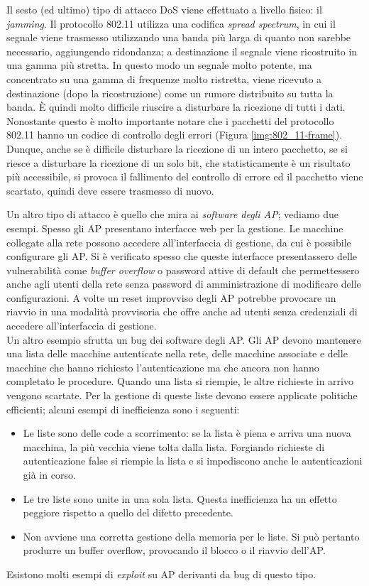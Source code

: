 Il sesto (ed ultimo) tipo di attacco DoS viene effettuato a livello fisico: il \textit{jamming}. Il protocollo 802.11 utilizza una codifica \textit{spread spectrum}, in cui il segnale viene trasmesso utilizzando una banda più larga di quanto non sarebbe necessario, aggiungendo ridondanza; a destinazione il segnale viene ricostruito in una gamma più stretta. In questo modo un segnale molto potente, ma concentrato su una gamma di frequenze molto ristretta, viene ricevuto a destinazione (dopo la ricostruzione) come un rumore distribuito su tutta la banda. È quindi molto difficile riuscire a disturbare la ricezione di tutti i dati. Nonostante questo è molto importante notare che i pacchetti del protocollo 802.11 hanno un codice di controllo degli errori (Figura \ref{img:802_11-frame}). Dunque, anche se è difficile disturbare la ricezione di un intero pacchetto, se si riesce a disturbare la ricezione di un solo bit, che statisticamente è un risultato più accessibile, si provoca il fallimento del controllo di errore ed il pacchetto viene scartato, quindi deve essere trasmesso di nuovo.

Un altro tipo di attacco è quello che mira ai \textit{software degli AP}; vediamo due esempi. Spesso gli AP presentano interfacce web per la gestione. Le macchine collegate alla rete possono accedere all'interfaccia di gestione, da cui è possibile configurare gli AP. Si è verificato spesso che queste interfacce presentassero delle vulnerabilità come \textit{buffer overflow} o password attive di default che permettessero anche agli utenti della rete senza password di amministrazione di modificare delle configurazioni. A volte un reset improvviso degli AP potrebbe provocare un riavvio in una modalità provvisoria che offre anche ad utenti senza credenziali di accedere all'interfaccia di gestione.\\
Un altro esempio sfrutta un bug dei software degli AP. Gli AP devono mantenere una lista delle macchine autenticate nella rete, delle macchine associate e delle macchine che hanno richiesto l'autenticazione ma che ancora non hanno completato le procedure. Quando una lista si riempie, le altre richieste in arrivo vengono scartate. Per la gestione di queste liste devono essere applicate politiche efficienti; alcuni esempi di inefficienza sono i seguenti:
\begin{itemize}
	\item Le liste sono delle code a scorrimento: se la lista è piena e arriva una nuova macchina, la più vecchia viene tolta dalla lista. Forgiando richieste di autenticazione false si riempie la lista e si impediscono anche le autenticazioni già in corso.
	\item Le tre liste sono unite in una sola lista. Questa inefficienza ha un effetto peggiore rispetto a quello del difetto precedente.
	\item Non avviene una corretta gestione della memoria per le liste. Si può pertanto produrre un buffer overflow, provocando il blocco o il riavvio dell'AP.
\end{itemize}
Esistono molti esempi di \textit{exploit} su AP derivanti da bug di questo tipo.

